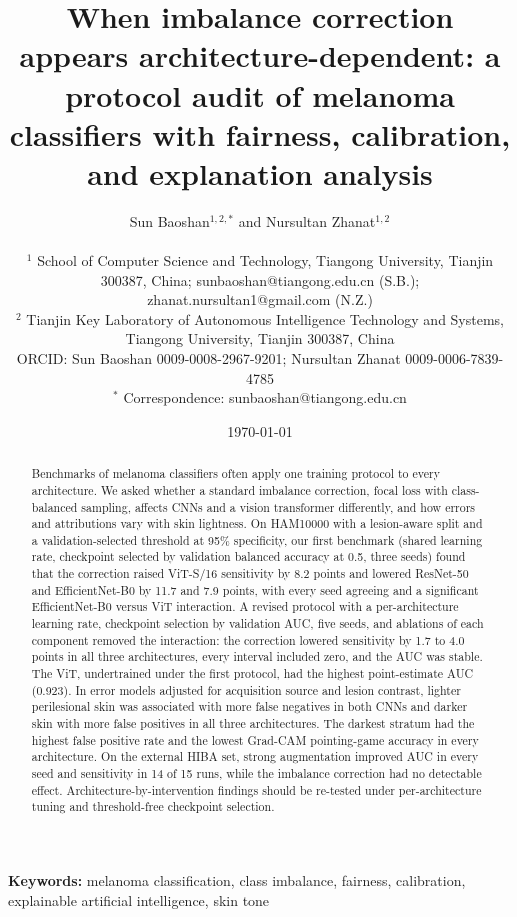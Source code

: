 \documentclass[11pt]{article}
\title{When imbalance correction appears architecture-dependent: a protocol audit of melanoma classifiers with fairness, calibration, and explanation analysis}
\author{
  Sun Baoshan$^{1,2,*}$ and Nursultan Zhanat$^{1,2}$\\[8pt]
  \parbox{0.92\textwidth}{\centering\small
  $^{1}$ School of Computer Science and Technology, Tiangong University, Tianjin 300387, China; sunbaoshan@tiangong.edu.cn (S.B.); zhanat.nursultan1@gmail.com (N.Z.)\\
  $^{2}$ Tianjin Key Laboratory of Autonomous Intelligence Technology and Systems, Tiangong University, Tianjin 300387, China\\
  ORCID: Sun Baoshan 0009-0008-2967-9201; Nursultan Zhanat 0009-0006-7839-4785\\
  $^{*}$ Correspondence: sunbaoshan@tiangong.edu.cn
  }
}
\date{\today}
\begin{document}
\maketitle

\begin{abstract}
Benchmarks of melanoma classifiers often apply one training protocol to every architecture. We asked whether a standard imbalance correction, focal loss with class-balanced sampling, affects CNNs and a vision transformer differently, and how errors and attributions vary with skin lightness. On HAM10000 with a lesion-aware split and a validation-selected threshold at 95\% specificity, our first benchmark (shared learning rate, checkpoint selected by validation balanced accuracy at 0.5, three seeds) found that the correction raised ViT-S/16 sensitivity by 8.2 points and lowered ResNet-50 and EfficientNet-B0 by 11.7 and 7.9 points, with every seed agreeing and a significant EfficientNet-B0 versus ViT interaction. A revised protocol with a per-architecture learning rate, checkpoint selection by validation AUC, five seeds, and ablations of each component removed the interaction: the correction lowered sensitivity by 1.7 to 4.0 points in all three architectures, every interval included zero, and the AUC was stable. The ViT, undertrained under the first protocol, had the highest point-estimate AUC (0.923). In error models adjusted for acquisition source and lesion contrast, lighter perilesional skin was associated with more false negatives in both CNNs and darker skin with more false positives in all three architectures. The darkest stratum had the highest false positive rate and the lowest Grad-CAM pointing-game accuracy in every architecture. On the external HIBA set, strong augmentation improved AUC in every seed and sensitivity in 14 of 15 runs, while the imbalance correction had no detectable effect. Architecture-by-intervention findings should be re-tested under per-architecture tuning and threshold-free checkpoint selection.
\end{abstract}

\noindent\textbf{Keywords:} melanoma classification, class imbalance, fairness, calibration, explainable artificial intelligence, skin tone












\end{document}
